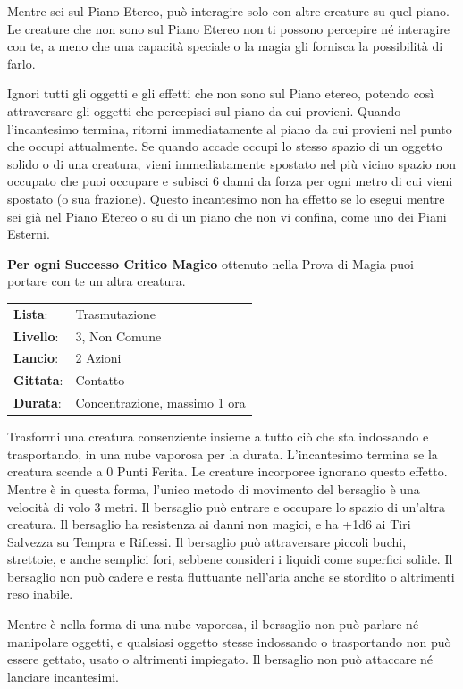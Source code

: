 \begin{multicols}{2}
Mentre sei sul Piano Etereo, può interagire solo con altre creature su quel piano. Le creature che non sono sul Piano Etereo non ti possono percepire né interagire con te, a meno che una capacità speciale o la magia gli fornisca la possibilità di farlo.

Ignori tutti gli oggetti e gli effetti che non sono sul Piano etereo, potendo così attraversare gli oggetti che percepisci sul piano da cui provieni. Quando l'incantesimo termina, ritorni immediatamente al piano da cui provieni nel punto che occupi attualmente. Se quando accade occupi lo stesso spazio di un oggetto solido o di una creatura, vieni immediatamente spostato nel più vicino spazio non occupato che puoi occupare e subisci 6 danni da forza per ogni metro di cui vieni spostato (o sua frazione). Questo incantesimo non ha effetto se lo esegui mentre sei già nel Piano Etereo o su di un piano che non vi confina, come uno dei Piani Esterni.

\textbf{Per ogni Successo Critico Magico} ottenuto nella Prova di Magia puoi portare con te un altra creatura.

\noindent\begin{tabularx}{\linewidth}{p{1.3cm}X}
	\rowcolor{gray!20}\textbf{Lista}: & Trasmutazione \\
	\textbf{Livello}: & 3, Non Comune \\
	\rowcolor{gray!20}\textbf{Lancio}: & 2 Azioni \\
	\textbf{Gittata}: & Contatto \\
	\rowcolor{gray!20}\textbf{Durata}: & Concentrazione, massimo 1 ora \\
\end{tabularx}\smallskip

Trasformi una creatura consenziente insieme a tutto ciò che sta indossando e trasportando, in una nube vaporosa per la durata. L'incantesimo termina se la creatura scende a 0 Punti Ferita. Le creature incorporee ignorano questo effetto. Mentre è in questa forma, l'unico metodo di movimento del bersaglio è una velocità di volo 3 metri. Il bersaglio può entrare e occupare lo spazio di un'altra creatura. Il bersaglio ha resistenza ai danni non magici, e ha +1d6 ai Tiri Salvezza su Tempra e Riflessi. Il bersaglio può attraversare piccoli buchi, strettoie, e anche semplici fori, sebbene consideri i liquidi come superfici solide. Il bersaglio non può cadere e resta fluttuante nell'aria anche se stordito o altrimenti reso inabile.

Mentre è nella forma di una nube vaporosa, il bersaglio non può parlare né manipolare oggetti, e qualsiasi oggetto stesse indossando o trasportando non può essere gettato, usato o altrimenti impiegato. Il bersaglio non può attaccare né lanciare incantesimi.


\end{multicols}
